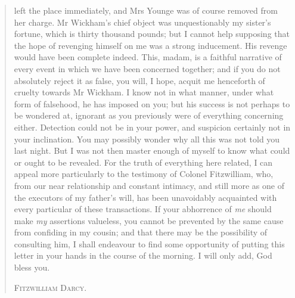 \begin{quotation}
left the place immediately, and Mrs Younge was of course removed from her charge. Mr Wickham's chief object was unquestionably my sister's fortune, which is thirty thousand pounds; but I cannot help supposing that the hope of revenging himself on me was a strong inducement. His revenge would have been complete indeed. This, madam, is a faithful narrative of every event in which we have been concerned together; and if you do not absolutely reject it as false, you will, I hope, acquit me henceforth of cruelty towards Mr Wickham. I know not in what manner, under what form of falsehood, he has imposed on you; but his success is not perhaps to be wondered at, ignorant as you previously were of everything concerning either. Detection could not be in your power, and suspicion certainly not in your inclination. You may possibly wonder why all this was not told you last night. But I was not then master enough of myself to know what could or ought to be revealed. For the truth of everything here related, I can appeal more particularly to the testimony of Colonel Fitzwilliam, who, from our near relationship and constant intimacy, and still more as one of the executors of my father's will, has been unavoidably acquainted with every particular of these transactions. If your abhorrence of \textit{me} should make \textit{my} assertions valueless, you cannot be prevented by the same cause from confiding in my cousin; and that there may be the possibility of consulting him, I shall endeavour to find some opportunity of putting this letter in your hands in the course of the morning. I will only add, God bless you.

\begin{flushright}
\textsc{Fitzwilliam Darcy.}
\end{flushright}

\end{quotation}